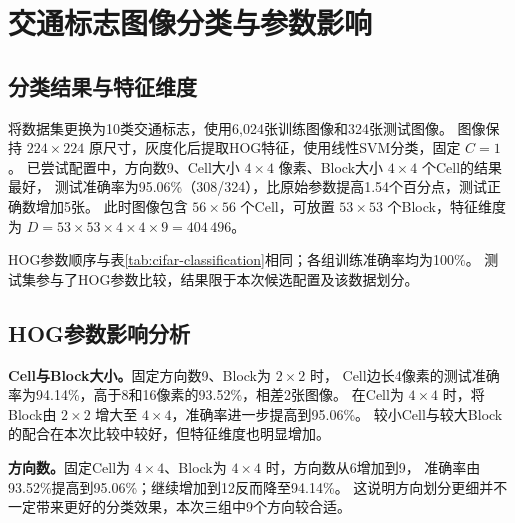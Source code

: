 \Needspace{130bp}
\section{交通标志图像分类与参数影响}

\subsection{分类结果与特征维度}
将数据集更换为10类交通标志，使用6,024张训练图像和324张测试图像。
图像保持 $224\times224$ 原尺寸，灰度化后提取HOG特征，使用线性SVM分类，固定 $C=1$。
已尝试配置中，方向数9、Cell大小 $4\times4$ 像素、Block大小 $4\times4$ 个Cell的结果最好，
测试准确率为95.06\%（308/324），比原始参数提高1.54个百分点，测试正确数增加5张。
此时图像包含 $56\times56$ 个Cell，可放置 $53\times53$ 个Block，特征维度为
$D=53\times53\times4\times4\times9=404\,496$。


HOG参数顺序与表\ref{tab:cifar-classification}相同；各组训练准确率均为100\%。
测试集参与了HOG参数比较，结果限于本次候选配置及该数据划分。

\subsection{HOG参数影响分析}
\textbf{Cell与Block大小。}固定方向数9、Block为 $2\times2$ 时，
Cell边长4像素的测试准确率为94.14\%，高于8和16像素的93.52\%，相差2张图像。
在Cell为 $4\times4$ 时，将Block由 $2\times2$ 增大至 $4\times4$，准确率进一步提高到95.06\%。
较小Cell与较大Block的配合在本次比较中较好，但特征维度也明显增加。

\textbf{方向数。}固定Cell为 $4\times4$、Block为 $4\times4$ 时，方向数从6增加到9，
准确率由93.52\%提高到95.06\%；继续增加到12反而降至94.14\%。
这说明方向划分更细并不一定带来更好的分类效果，本次三组中9个方向较合适。


